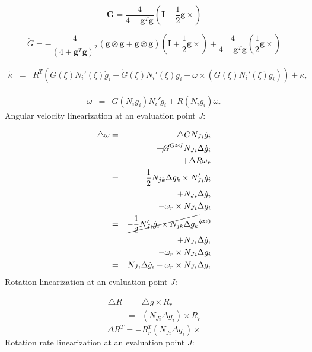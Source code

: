 \[
\boldsymbol{G}	= \frac{4}{4+\boldsymbol{g}^{T}\boldsymbol{g}}(\boldsymbol{I}+\frac{1}{2}\boldsymbol{g}\times)
\]

\[
\dot{G}=-\frac{4}{(4+\boldsymbol{g}^{T}\boldsymbol{g})^{2}}(
		\dot{\boldsymbol{g}}\otimes\boldsymbol{g}+
		\boldsymbol{g}\otimes\dot{\boldsymbol{g}}
	)(\boldsymbol{I}+\frac{1}{2}\boldsymbol{g}\times)
	+\frac{4}{4+\boldsymbol{g}^{T}\boldsymbol{g}}(\frac{1}{2}\dot{\boldsymbol{g}}\times)
\]

\begin{eqnarray*}
\dot{\tilde{\kappa}} & = & R^{T}(G(\xi)N_{i}'(\xi)\dot{g}_{i}+\dot{G}(\xi)N_{i}'(\xi)g_{i}-\omega\times(G(\xi)N_{i}'(\xi)g_{i}))+\dot{\kappa}_{r}
\end{eqnarray*}

\begin{eqnarray*}
\omega & = & G(N_{i}g_{i})N_{i}'\dot{g}_{i}+R(N_{i}g_{i})\omega_{r}
\end{eqnarray*}
Angular velocity linearization at an evaluation point $J$:

\begin{eqnarray*}
\triangle\omega & = & \triangle GN_{Ji}\dot{g}_{i}\\
 &  & +\cancel{G}^{G\approx I}N_{Ji}\Delta\dot{g}_{i}\\
 &  & +\Delta R\omega_{r}\\
 & = & \frac{1}{2}N_{jk}\Delta g_{k}\times N'_{Ji}\dot{g}_{i}\\
 &  & +N_{Ji}\Delta\dot{g}_{i}\\
 &  & -\omega_{r}\times N_{Ji}\Delta g_{i}\\
 & = & \cancel{-\frac{1}{2}N'_{Ji}\dot{g}_{i}\times N_{jk}\Delta g_{k}}^{\dot{g}\approx0}\\
 &  & +N_{Ji}\Delta\dot{g}_{i}\\
 &  & -\omega_{r}\times N_{Ji}\Delta g_{i}\\
 & = & N_{Ji}\Delta\dot{g}_{i}-\omega_{r}\times N_{Ji}\Delta g_{i}
\end{eqnarray*}
Rotation linearization at an evaluation point $J$:

\begin{eqnarray*}
\triangle R & = & \triangle g\times R_{r}\\
 & = & (N_{Ji}\Delta g_{i})\times R_{r}
\end{eqnarray*}
\[
\Delta R^{T}=-R_{r}^{T}(N_{Ji}\Delta g_{i})\times
\]
Rotation rate linearization at an evaluation point $J$:

